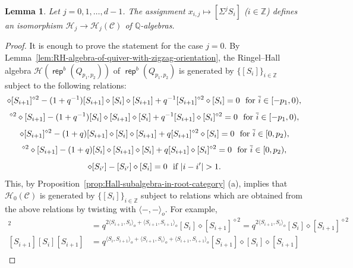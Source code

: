 \documentclass[reqno,12pt,a4paper]{amsart}
\newtheorem{lemma}[theorem]{Lemma}
\theoremstyle{remark}
\theoremstyle{definition}
\newcommand{\opname}[1]{\operatorname{\mathsf{#1}}}
\newcommand{\rep}{\opname{rep}\nolimits}
\newcommand{\cc}{{\mathcal C}}
\newcommand{\ch}{{\mathcal H}}
\numberwithin{equation}{section}
\begin{document}
\begin{lemma}
\label{lem:relations-in-the-first-group-zigzag}
Let $j=0,1,\ldots,d-1$.
The assignment $x_{i,j}\mapsto [\Sigma^j S_i]$ ($i\in\mathbb{Z}$) defines an isomorphism $\ch_j\to\ch_j(\cc)$ of $\mathbb{Q}$-algebras.
\end{lemma}
\begin{proof}
It is enough to prove the statement for the case $j=0$. By Lemma~\ref{lem:RH-algebra-of-quiver-with-zigzag-orientation}, the Ringel--Hall algebra $\ch(\rep^b(Q_{p_1,p_2}))$ of $\rep^b(Q_{p_1,p_2})$ is generated by $\{[S_i]\}_{i\in \mathbb{Z}}$ subject to the following relations:
\begin{equation*}
    [S_i]\diamond[S_{i+1}]^{\diamond 2}-(1+q^{-1})[S_{i+1}]\diamond[S_i]\diamond[S_{i+1}]+q^{-1}[S_{i+1}]^{\diamond2}\diamond[S_i]=0 ~\hbox{ for $\overline{i}\in[-p_1,0)$},
\end{equation*}
\begin{equation*}
   [S_i]^{\diamond2}\diamond[S_{i+1}]-(1+q^{-1})[S_i]\diamond[S_{i+1}]\diamond[S_i]+q^{-1}[S_{i+1}]\diamond[S_i]^{\diamond2} =0~\hbox{ for $\overline{i}\in[-p_1,0)$},
\end{equation*}
\begin{equation*}
    [S_i]\diamond[S_{i+1}]^{\diamond 2}-(1+q)[S_{i+1}]\diamond[S_i]\diamond[S_{i+1}]+q[S_{i+1}]^{\diamond2}\diamond[S_i]=0 ~\hbox{ for $\overline{i}\in[0,p_2)$},
  \end{equation*}
  \begin{equation*}
   [S_i]^{\diamond2}\diamond[S_{i+1}]-(1+q)[S_i]\diamond[S_{i+1}]\diamond[S_i]+q[S_{i+1}]\diamond[S_i]^{\diamond2}=0 ~\hbox{ for $\overline{i}\in[0,p_2)$},
  \end{equation*}
  \begin{equation*}
  [S_i]\diamond[S_{i'}]-[S_{i'}]\diamond[S_i]=0 ~\hbox{ if }|i-i'|>1.
  \end{equation*}
This, by Proposition~\ref{prop:Hall-subalgebra-in-root-category} (a), implies that $\ch_0(\cc)$ is generated by $\{[S_i]\}_{i\in \mathbb{Z}}$ subject to relations which are obtained from the above relations by twisting with $\langle-,-\rangle_o$.
For example,
\begin{align*}
  [S_i][S_{i+1}]^2 &= q^{2\langle S_{i+1}, S_i\rangle_o+\langle S_{i+1},S_{i+1}\rangle_o}[S_i]\diamond[S_{i+1}]^{\diamond 2}=q^{2\langle S_{i+1}, S_i\rangle_o}[S_i]\diamond[S_{i+1}]^{\diamond 2} \\
  {[S_{i+1}][S_i][S_{i+1}]} &= q^{\langle S_i,S_{i+1}\rangle_o+\langle S_{i+1},S_{i}\rangle_o+\langle S_{i+1},S_{i+1}\rangle_o}{[S_{i+1}]\diamond[S_i]\diamond[S_{i+1}]}\\

\end{align*}
\end{proof}
\end{document}
